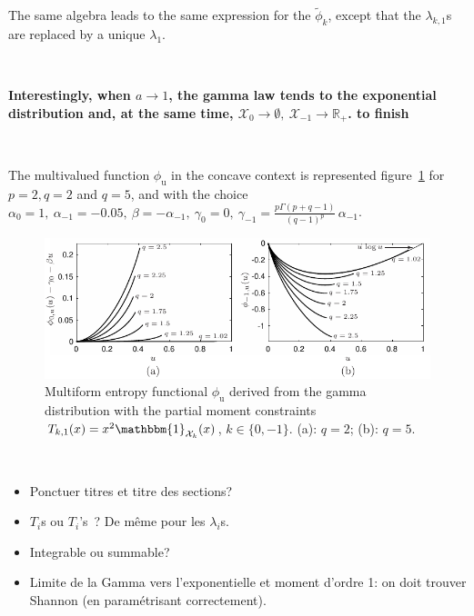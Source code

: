 \documentclass[entropy,article,submit,moreauthors,pdftex]{Definitions/mdpi}
\newcommand{\SZ}[1]{{\color{blue} #1}}                                       %
\newcommand{\Avoir}[1]{{\color{red}\bf #1}}                                  %
\def\Rset{\mathbb{R}}%
\def\X{\mathcal{X}}%
\def\un{\mathbbm{1}}%
\def\u{\mathrm{u}}
\begin{document}
The  same algebra  leads to  the same  expression for  the $\widetilde{\phi}_k$,
except that the $\lambda_{k,1}$s are replaced by a unique $\lambda_1$.

\


\Avoir{Interestingly, when  $a \to 1$,  the gamma  law tends to  the exponential
  distribution  and, at  the  same time,  $\X_0 \to  \emptyset,  \: \X_{-1}  \to
  \Rset_+$. to finish}

\

The  multivalued  function  $\phi_\u$  in the  concave  context  is  represented
figure~\ref{fig:Entropy-gamma} for  $p = 2,  q =  2$ and $q  = 5$, and  with the
choice \SZ{$\alpha_0 = 1,  \: \alpha_{-1} = -0.05, \: \beta  = - \alpha_{-1}, \:
  \gamma_0   =  0,   \:   \gamma_{-1}  =   \frac{p  \Gamma(p+q-1)}{(q-1)^p}   \,
  \alpha_{-1}$}.

\begin{figure}[htbp]
\centerline{\includegraphics[width=.78\textwidth]{PDF/MaxEnt_GammaLaw}}
\caption{Multiform  entropy   functional  $\phi_\u$   derived  from   the  gamma
  distribution   with  the   partial  moment   constraints  $T_{k,1}(x)   =  x^2
  \un_{\X_k}(x)$, $k\in\{0,-1\}$.  (a): $q = 2$; (b): $q = 5$.}
\label{fig:Entropy-gamma} 
\end{figure}

\


\Avoir{
  \begin{itemize}
  \item Ponctuer titres et titre des sections?
  \item $T_i$s ou $T_i$'s~? De m\^eme pour les $\lambda_i$s.
  \item Integrable ou summable?
  \item Limite  de la Gamma  vers l'exponentielle et  moment d'ordre 1:  on doit
    trouver Shannon (en param\'etrisant correctement).
  \end{itemize}
  }


\end{document}
